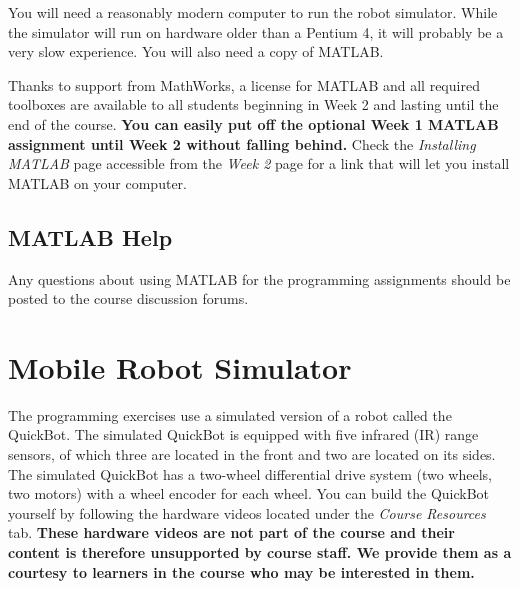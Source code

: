 \documentclass[10pt]{article}
\begin{document}
You will need a reasonably modern computer to run the robot simulator. While the simulator will run on hardware older than a Pentium 4, it will probably be a very slow experience. You will also need a copy of MATLAB. 

Thanks to support from MathWorks, a license for MATLAB and all required toolboxes are available to all students beginning in Week 2 and lasting until the end of the course. \textbf{You can easily put off the optional Week 1 MATLAB assignment until Week 2 without falling behind.} Check the \emph{Installing MATLAB} page accessible from the \emph{Week 2} page for a link that will let you install MATLAB on your computer. 

\subsection{MATLAB Help}
Any questions about using MATLAB for the programming assignments should be posted to the course discussion forums. 

\newpage
\section{Mobile Robot Simulator}

The programming exercises use a simulated version of a robot called the QuickBot. The simulated QuickBot is equipped with five infrared (IR) range sensors, of which three are located in the front and two are located on its sides. The simulated QuickBot has a two-wheel differential drive system (two wheels, two motors) with a wheel encoder for each wheel. You can build the QuickBot yourself by following the hardware videos located under the \emph{Course Resources} tab. \textbf{These hardware videos are not part of the course and their content is therefore unsupported by course staff. We provide them as a courtesy to learners in the course who may be interested in them.} 
\end{document}

